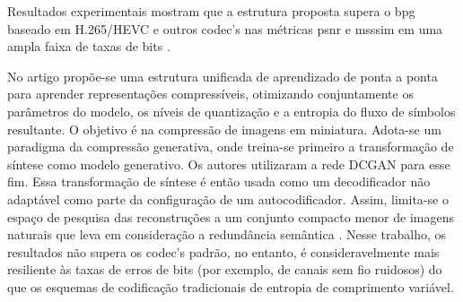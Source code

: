 
Resultados experimentais mostram que a estrutura proposta supera o \acrshort{bpg} baseado em H.265/HEVC e outros \acrshort{codec}'s nas métricas \acrshort{psnr} e \acrshort{msssim} em uma ampla faixa de taxas de bits  \cite{akbari2019dsslic}.









No artigo \cite{santurkar2018generative} propõe-se uma estrutura unificada de aprendizado de ponta a ponta para aprender representações compressíveis, otimizando conjuntamente os parâmetros do modelo, os níveis de quantização e a entropia do fluxo de símbolos resultante. O objetivo é na compressão de imagens em miniatura.
Adota-se um paradigma da compressão generativa, onde treina-se primeiro a transformação de síntese como modelo generativo. Os autores utilizaram a rede DCGAN \cite{radford2015unsupervised} para esse fim. Essa transformação de síntese é então usada como um decodificador não adaptável como parte da configuração de um autocodificador. Assim, limita-se o espaço de pesquisa das reconstruções a um conjunto compacto menor de imagens naturais que leva em consideração a redundância semântica \cite{santurkar2018generative}. 
Nesse trabalho, os resultados não supera os \acrshort{codec}'s padrão, no entanto, é consideravelmente mais resiliente às taxas de erros de bits (por exemplo, de canais sem fio ruidosos) do que os esquemas de codificação tradicionais de entropia de comprimento variável.


